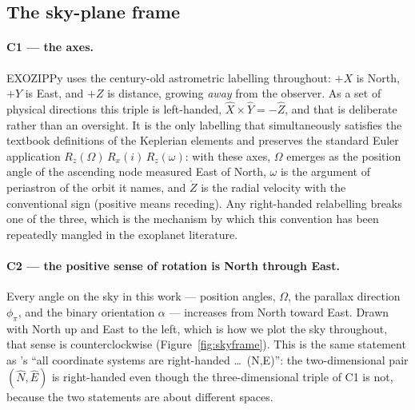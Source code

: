 \subsection{The sky-plane frame}
\label{sec:conv:frame}

\paragraph{C1 --- the axes.}  EXOZIPPy uses the century-old astrometric
labelling throughout: $+X$ is North, $+Y$ is East, and $+Z$ is distance,
growing \emph{away} from the observer.  As a set of physical directions
this triple is left-handed, $\hat{X}\times\hat{Y} = -\hat{Z}$, and that is
deliberate rather than an oversight.  It is the only labelling that
simultaneously satisfies the textbook definitions of the Keplerian elements
and preserves the standard Euler application $R_z(\Omega)\,R_x(i)\,
R_z(\omega)$: with these axes, $\Omega$ emerges as the position angle of
the ascending node measured East of North, $\omega$ is the argument of
periastron of the orbit it names, and $\dot{Z}$ is the radial velocity with
the conventional sign (positive means receding).  Any right-handed
relabelling breaks one of the three, which is the mechanism by which this
convention has been repeatedly mangled in the exoplanet literature.

\paragraph{C2 --- the positive sense of rotation is North through East.}
Every angle on the sky in this work --- position angles, $\Omega$, the
parallax direction $\phi_\pi$, and the binary orientation $\alpha$ ---
increases from North toward East.  Drawn with North up and East to the
left, which is how we plot the sky throughout, that sense is
counterclockwise (Figure~\ref{fig:skyframe}).  This is the same statement
as \citeauthor{Skowron:2011}'s ``all coordinate systems are right-handed
\ldots\ (N,E)'': the two-dimensional pair $(\hat{N},\hat{E})$ is
right-handed even though the three-dimensional triple of C1 is not, because
the two statements are about different spaces.

